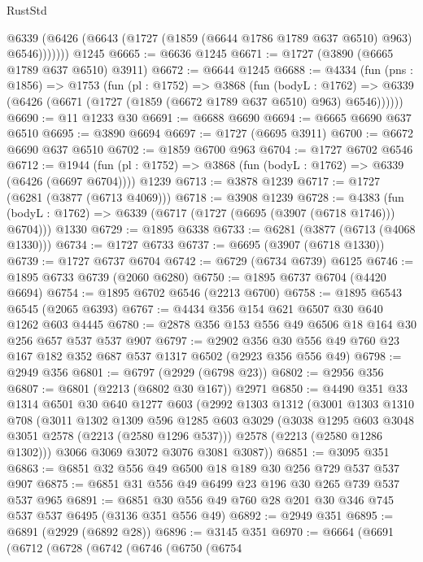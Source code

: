 \begin{lexlean}{RustStd}
\begin{coremodule}
          @6339 (@6426 (@6643 (@1727 (@1859 (@6644 @1786 @1789 @637 @6510) @963) @6546)))))))
    @1245
@6665 := @6636 @1245
@6671 := @1727 (@3890 (@6665 @1789 @637 @6510) @3911)
@6672 := @6644 @1245
@6688 := @4334
    (fun (pns : @1856) =>
    @1753
      (fun (pl : @1752) =>
      @3868
        (fun (bodyL : @1762) =>
        @6339 (@6426 (@6671 (@1727 (@1859 (@6672 @1789 @637 @6510) @963) @6546))))))
@6690 := @11 @1233 @30
@6691 := @6688 @6690
@6694 := @6665 @6690 @637 @6510
@6695 := @3890 @6694
@6697 := @1727 (@6695 @3911)
@6700 := @6672 @6690 @637 @6510
@6702 := @1859 @6700 @963
@6704 := @1727 @6702 @6546
@6712 := @1944
    (fun (pl : @1752) => @3868 (fun (bodyL : @1762) => @6339 (@6426 (@6697 @6704))))
    @1239
@6713 := @3878 @1239
@6717 := @1727 (@6281 (@3877 (@6713 @4069)))
@6718 := @3908 @1239
@6728 := @4383
    (fun (bodyL : @1762) => @6339 (@6717 (@1727 (@6695 (@3907 (@6718 @1746))) @6704)))
    @1330
@6729 := @1895 @6338
@6733 := @6281 (@3877 (@6713 (@4068 @1330)))
@6734 := @1727 @6733
@6737 := @6695 (@3907 (@6718 @1330))
@6739 := @1727 @6737 @6704
@6742 := @6729 (@6734 @6739) @6125
@6746 := @1895 @6733 @6739 (@2060 @6280)
@6750 := @1895 @6737 @6704 (@4420 @6694)
@6754 := @1895 @6702 @6546 (@2213 @6700)
@6758 := @1895 @6543 @6545 (@2065 @6393)
@6767 := @4434 @356 @154 @621 @6507 @30 @640 @1262 @603 @4445
@6780 := @2878 @356 @153 @556 @49 @6506 @18 @164 @30 @256 @657 @537 @537 @907
@6797 := @2902 @356 @30 @556 @49 @760 @23 @167 @182 @352 @687 @537 @1317 @6502 (@2923 @356 @556 @49)
@6798 := @2949 @356
@6801 := @6797 (@2929 (@6798 @23))
@6802 := @2956 @356
@6807 := @6801 (@2213 (@6802 @30 @167)) @2971
@6850 := @4490
    @351
    @33
    @1314
    @6501
    @30
    @640
    @1277
    @603
    (@2992
      @1303
      @1312
      (@3001
        @1303
        @1310
        @708
        (@3011
          @1302
          @1309
          @596
          @1285
          @603
          @3029
          (@3038 @1295 @603 @3048 @3051 @2578 (@2213 (@2580 @1296 @537)))
          @2578
          (@2213 (@2580 @1286 @1302)))
        @3066
        @3069
        @3072
        @3076
        @3081
        @3087))
@6851 := @3095 @351
@6863 := @6851 @32 @556 @49 @6500 @18 @189 @30 @256 @729 @537 @537 @907
@6875 := @6851 @31 @556 @49 @6499 @23 @196 @30 @265 @739 @537 @537 @965
@6891 := @6851 @30 @556 @49 @760 @28 @201 @30 @346 @745 @537 @537 @6495 (@3136 @351 @556 @49)
@6892 := @2949 @351
@6895 := @6891 (@2929 (@6892 @28))
@6896 := @3145 @351
@6970 := @6664
    (@6691
      (@6712
        (@6728
          (@6742
            (@6746
              (@6750
                (@6754

\end{coremodule}
\end{lexlean}
